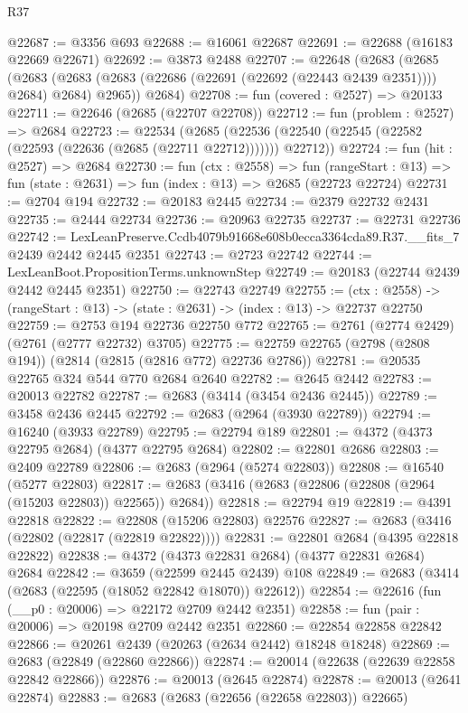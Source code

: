 \begin{lexlean}{R37}
\begin{coremodule}
@22687 := @3356 @693
@22688 := @16061 @22687
@22691 := @22688 (@16183 @22669 @22671)
@22692 := @3873 @2488
@22707 := @22648
    (@2683
      (@2685
        (@2683 (@2683 (@2683 (@22686 (@22691 (@22692 (@22443 @2439 @2351)))) @2684) @2684) @2965))
      @2684)
@22708 := fun (covered : @2527) => @20133
@22711 := @22646 (@2685 (@22707 @22708))
@22712 := fun (problem : @2527) => @2684
@22723 := @22534
    (@2685 (@22536 (@22540 (@22545 (@22582 (@22593 (@22636 (@2685 (@22711 @22712))))))) @22712))
@22724 := fun (hit : @2527) => @2684
@22730 := fun (ctx : @2558) =>
  fun (rangeStart : @13) => fun (state : @2631) => fun (index : @13) => @2685 (@22723 @22724)
@22731 := @2704 @194
@22732 := @20183 @2445
@22734 := @2379 @22732 @2431
@22735 := @2444 @22734
@22736 := @20963 @22735
@22737 := @22731 @22736
@22742 := LexLeanPreserve.Ccdb4079b91668e608b0ecca3364cda89.R37.__fits_7 @2439 @2442 @2445 @2351
@22743 := @2723 @22742
@22744 := LexLeanBoot.PropositionTerms.unknownStep
@22749 := @20183 (@22744 @2439 @2442 @2445 @2351)
@22750 := @22743 @22749
@22755 := (ctx : @2558) -> (rangeStart : @13) -> (state : @2631) -> (index : @13) -> @22737 @22750
@22759 := @2753 @194 @22736 @22750 @772
@22765 := @2761 (@2774 @2429) (@2761 (@2777 @22732) @3705)
@22775 := @22759 @22765 (@2798 (@2808 @194)) (@2814 (@2815 (@2816 @772) @22736 @2786))
@22781 := @20535 @22765 @324 @544 @770 @2684 @2640
@22782 := @2645 @2442
@22783 := @20013 @22782
@22787 := @2683 (@3414 (@3454 @2436 @2445))
@22789 := @3458 @2436 @2445
@22792 := @2683 (@2964 (@3930 @22789))
@22794 := @16240 (@3933 @22789)
@22795 := @22794 @189
@22801 := @4372 (@4373 @22795 @2684) (@4377 @22795 @2684)
@22802 := @22801 @2686
@22803 := @2409 @22789
@22806 := @2683 (@2964 (@5274 @22803))
@22808 := @16540 (@5277 @22803)
@22817 := @2683 (@3416 (@2683 (@22806 (@22808 (@2964 (@15203 @22803)) @22565)) @2684))
@22818 := @22794 @19
@22819 := @4391 @22818
@22822 := @22808 (@15206 @22803) @22576
@22827 := @2683 (@3416 (@22802 (@22817 (@22819 @22822))))
@22831 := @22801 @2684 (@4395 @22818 @22822)
@22838 := @4372 (@4373 @22831 @2684) (@4377 @22831 @2684) @2684
@22842 := @3659 (@22599 @2445 @2439) @108
@22849 := @2683 (@3414 (@2683 (@22595 (@18052 @22842 @18070)) @22612))
@22854 := @22616 (fun (__p0 : @20006) => @22172 @2709 @2442 @2351)
@22858 := fun (pair : @20006) => @20198 @2709 @2442 @2351
@22860 := @22854 @22858 @22842
@22866 := @20261 @2439 (@20263 (@2634 @2442) @18248 @18248)
@22869 := @2683 (@22849 (@22860 @22866))
@22874 := @20014 (@22638 (@22639 @22858 @22842 @22866))
@22876 := @20013 (@2645 @22874)
@22878 := @20013 (@2641 @22874)
@22883 := @2683 (@2683 (@22656 (@22658 @22803)) @22665)

\end{coremodule}
\end{lexlean}
